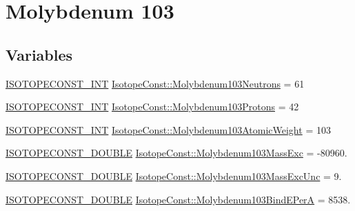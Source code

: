 \hypertarget{group___isotope_const-_molybdenum-_mo103}{}\section{Molybdenum 103}
\label{group___isotope_const-_molybdenum-_mo103}
\subsection*{Variables}
\begin{DoxyCompactItemize}
\item 
\mbox{\hyperlink{group___isotope_const-_macros_ga5f18360b3e99483a35c32d789e62621c}{I\+S\+O\+T\+O\+P\+E\+C\+O\+N\+S\+T\+\_\+\+I\+NT}} \mbox{\hyperlink{group___isotope_const-_molybdenum-_mo103_gac01f44530a9d59309eb6b41dcf4193d8}{Isotope\+Const\+::\+Molybdenum103\+Neutrons}} = 61
\item 
\mbox{\hyperlink{group___isotope_const-_macros_ga5f18360b3e99483a35c32d789e62621c}{I\+S\+O\+T\+O\+P\+E\+C\+O\+N\+S\+T\+\_\+\+I\+NT}} \mbox{\hyperlink{group___isotope_const-_molybdenum-_mo103_ga02adeefde4c653d647358e2159ed344b}{Isotope\+Const\+::\+Molybdenum103\+Protons}} = 42
\item 
\mbox{\hyperlink{group___isotope_const-_macros_ga5f18360b3e99483a35c32d789e62621c}{I\+S\+O\+T\+O\+P\+E\+C\+O\+N\+S\+T\+\_\+\+I\+NT}} \mbox{\hyperlink{group___isotope_const-_molybdenum-_mo103_ga04e882489008fbb0ad3352acdc7e8916}{Isotope\+Const\+::\+Molybdenum103\+Atomic\+Weight}} = 103
\item 
\mbox{\hyperlink{group___isotope_const-_macros_ga8f45a7272ce02c0b4c65c44636ed719a}{I\+S\+O\+T\+O\+P\+E\+C\+O\+N\+S\+T\+\_\+\+D\+O\+U\+B\+LE}} \mbox{\hyperlink{group___isotope_const-_molybdenum-_mo103_ga55231214cb3fe03d42d407485a551a5f}{Isotope\+Const\+::\+Molybdenum103\+Mass\+Exc}} = -\/80960.
\item 
\mbox{\hyperlink{group___isotope_const-_macros_ga8f45a7272ce02c0b4c65c44636ed719a}{I\+S\+O\+T\+O\+P\+E\+C\+O\+N\+S\+T\+\_\+\+D\+O\+U\+B\+LE}} \mbox{\hyperlink{group___isotope_const-_molybdenum-_mo103_gaa1f74c0b14f5da9dac0e78d6e3f5d58b}{Isotope\+Const\+::\+Molybdenum103\+Mass\+Exc\+Unc}} = 9.
\item 
\mbox{\hyperlink{group___isotope_const-_macros_ga8f45a7272ce02c0b4c65c44636ed719a}{I\+S\+O\+T\+O\+P\+E\+C\+O\+N\+S\+T\+\_\+\+D\+O\+U\+B\+LE}} \mbox{\hyperlink{group___isotope_const-_molybdenum-_mo103_gaacdb5dad1ec7bc745f9ca5ac4adb66b5}{Isotope\+Const\+::\+Molybdenum103\+Bind\+E\+PerA}} = 8538.
\item 

\end{DoxyCompactItemize}
